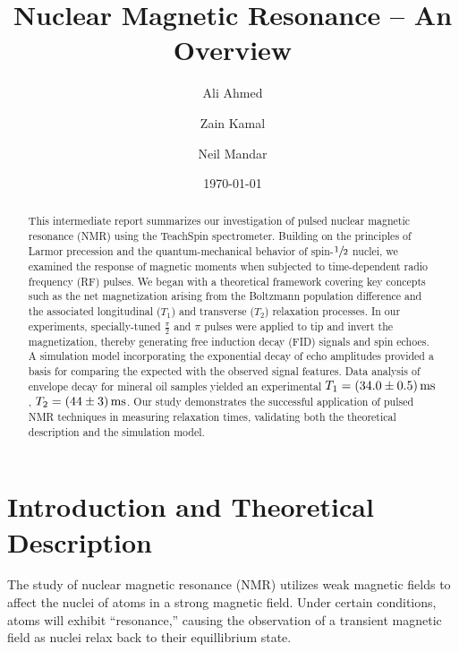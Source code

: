 \documentclass[%
 reprint,
 amsmath,amssymb,
 aps,
]{revtex4-2}
\newcommand{\half}{$\sfrac{1}{2}$ }
\newcommand{\halfpi}{\frac{\pi}{2}}
\begin{document}

\title{Nuclear Magnetic Resonance -- An Overview}

\author{Ali Ahmed}
\author{Zain Kamal}%
\author{Neil Mandar}%



\date{\today}%

\begin{abstract}
This intermediate report summarizes our investigation of pulsed nuclear magnetic resonance (NMR) using the TeachSpin spectrometer. Building on the principles of Larmor precession and the quantum-mechanical behavior of spin-\half nuclei, we examined the response of magnetic moments when subjected to time-dependent radio frequency (RF) pulses. We began with a theoretical framework covering key concepts such as the net magnetization arising from the Boltzmann population difference and the associated longitudinal ($T_1$) and transverse ($T_2$) relaxation processes. In our experiments, specially-tuned $\halfpi$ and $\pi$ pulses were applied to tip and invert the magnetization, thereby generating free induction decay (FID) signals and spin echoes. A simulation model incorporating the exponential decay of echo amplitudes provided a basis for comparing the expected with the observed signal features. Data analysis of envelope decay for mineral oil samples yielded an experimental $T_1 = \SI[uncertainty-mode=separate]{34\pm0.5}{\milli\second}$, $T_2 = \SI[uncertainty-mode=separate]{44\pm3}{\milli\second}$. Our study demonstrates the successful application of pulsed NMR techniques in measuring relaxation times, validating both the theoretical description and the simulation model.
\end{abstract}

\maketitle


\section{\label{sec:intro}Introduction and Theoretical Description}

The study of nuclear magnetic resonance (NMR) utilizes weak magnetic fields to affect the nuclei of atoms in a strong magnetic field. Under certain conditions, atoms will exhibit ``resonance,'' causing the observation of a transient magnetic field as nuclei relax back to their equillibrium state. 
\end{document}
